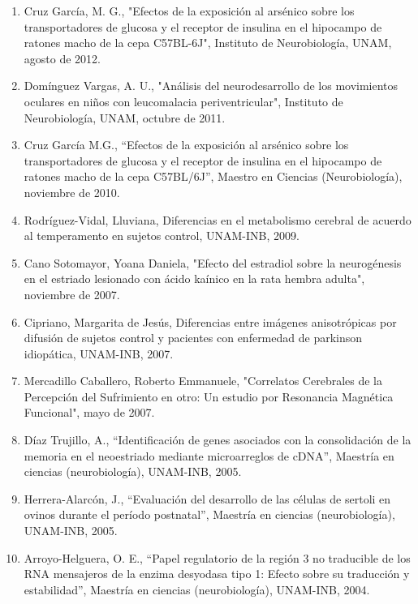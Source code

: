 \begin{enumerate}
\item Cruz García, M. G., "Efectos de la exposición al arsénico sobre los transportadores de glucosa y el receptor de 
insulina 
en el hipocampo de ratones macho de la cepa C57BL-6J", Instituto de Neurobiología, UNAM, agosto 
de 2012.

\item Domínguez Vargas, A. U., "Análisis del neurodesarrollo de los movimientos oculares en niños con leucomalacia 
periventricular", Instituto de Neurobiología, UNAM, octubre de 2011.

\item Cruz García M.G., “Efectos de la exposición al arsénico sobre los transportadores de glucosa y el receptor de insulina 
en 
el hipocampo de ratones macho de la cepa C57BL/6J”, Maestro en Ciencias (Neurobiología),
noviembre de 2010.

\item Rodríguez-Vidal, Lluviana, Diferencias en el metabolismo cerebral de acuerdo al temperamento en sujetos control, 
UNAM-INB, 2009.

\item Cano Sotomayor, Yoana Daniela, "Efecto del estradiol sobre la neurogénesis en el estriado lesionado con ácido kaínico 
en 
la rata hembra adulta", noviembre de 2007.

\item Cipriano, Margarita de Jesús, Diferencias entre imágenes anisotrópicas por difusión de sujetos control y pacientes con 
enfermedad de parkinson idiopática, UNAM-INB, 2007.

\item Mercadillo Caballero, Roberto Emmanuele, "Correlatos Cerebrales de la Percepción del Sufrimiento en otro: Un estudio 
por 
Resonancia Magnética Funcional", mayo de 2007.

\item Díaz Trujillo, A., “Identificación de genes asociados con la consolidación de la memoria en el neoestriado mediante 
microarreglos de cDNA”, Maestría en ciencias (neurobiología), UNAM-INB, 2005.

\item Herrera-Alarcón, J., “Evaluación del desarrollo de las células de sertoli en ovinos durante el período postnatal”, 
Maestría en ciencias (neurobiología), UNAM-INB, 2005.

\item Arroyo-Helguera, O. E., “Papel regulatorio de la región 3 no traducible de los RNA mensajeros de la enzima desyodasa 
tipo 
1: Efecto sobre su traducción y estabilidad”, Maestría en ciencias (neurobiología), UNAM-INB,
2004.


\end{enumerate}
